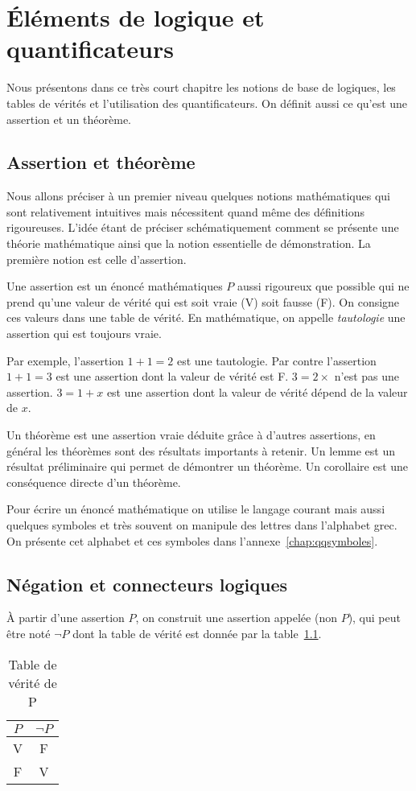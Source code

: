 \addtocounter{chapter}{-1}
\chapter{Éléments de logique et quantificateurs}
\minitoc
\minilof
\minilot
\lettrine{N}ous présentons dans ce très court chapitre les notions de base de logiques, les tables de vérités et l'utilisation des quantificateurs. On définit aussi ce qu'est une assertion et un théorème.
%
\section{Assertion et théorème}
\label{chap0sec:assertionettheoremes}
Nous allons préciser à un premier niveau quelques notions mathématiques qui sont relativement intuitives mais nécessitent quand même des définitions rigoureuses. L’idée étant de préciser schématiquement comment se présente une théorie mathématique ainsi que la notion essentielle de démonstration. La première notion est celle d’assertion.

Une assertion est un énoncé mathématiques $P$ aussi rigoureux que possible qui ne prend qu'une valeur de vérité qui est soit vraie (V) soit fausse (F). On consigne ces valeurs dans une table de vérité. En mathématique, on appelle \emph{tautologie} une assertion qui est toujours vraie.

Par exemple, l'assertion $1+1=2$ est une tautologie. Par contre l'assertion $1+1=3$ est une assertion dont la valeur de vérité est F. $3=2 \times$ n'est pas une assertion. $3=1+x$ est une assertion dont la valeur de vérité dépend de la valeur de $x$.

Un théorème est une assertion vraie déduite grâce à d'autres assertions, en général les théorèmes sont des résultats importants à retenir. Un lemme est un résultat préliminaire qui permet de démontrer un théorème. Un corollaire est une conséquence directe d'un théorème.

Pour écrire un énoncé mathématique on utilise le langage courant mais aussi quelques symboles et très souvent on manipule des lettres dans l'alphabet grec. On présente cet alphabet et ces symboles dans l'annexe~\ref{chap:qqsymboles}.

\section{Négation et connecteurs logiques}
\label{chap0sec:negationetconnecteurs}
À partir d'une assertion $P$, on construit une assertion appelée (non $P$), qui peut être noté $\neg P$ dont la table de vérité est donnée par la table~\ref{tab:tabveriteP}.
\begin{table}[!h]
  \centering
  \begin{tabular}{|c|c|}\hline
    $P$ & $\neg P$ \\ \hline
    V & F \\ F & V \\ \hline
  \end{tabular}
  \caption{Table de vérité de P}
  \label{tab:tabveriteP}
\end{table}

